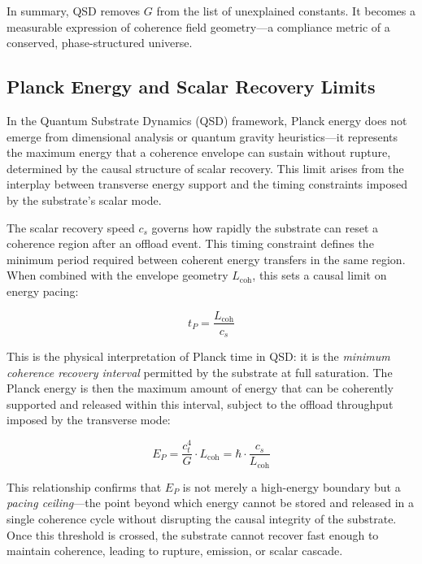 \documentclass[entropy,article,submit,pdftex,moreauthors]{Definitions/mdpi}
\begin{document}
\medskip
In summary, QSD removes $G$ from the list of unexplained constants. It becomes a measurable expression of coherence field geometry—a compliance metric of a conserved, phase-structured universe.

\subsection{Planck Energy and Scalar Recovery Limits}

In the Quantum Substrate Dynamics (QSD) framework, Planck energy does not emerge from dimensional analysis or quantum gravity heuristics—it represents the maximum energy that a coherence envelope can sustain without rupture, determined by the causal structure of scalar recovery. This limit arises from the interplay between transverse energy support and the timing constraints imposed by the substrate’s scalar mode.

The scalar recovery speed $c_s$ governs how rapidly the substrate can reset a coherence region after an offload event. This timing constraint defines the minimum period required between coherent energy transfers in the same region. When combined with the envelope geometry $L_{\text{coh}}$, this sets a causal limit on energy pacing:

\begin{equation}
t_P = \frac{L_{\text{coh}}}{c_s}
\end{equation}

This is the physical interpretation of Planck time in QSD: it is the \textit{minimum coherence recovery interval} permitted by the substrate at full saturation. The Planck energy is then the maximum amount of energy that can be coherently supported and released within this interval, subject to the offload throughput imposed by the transverse mode:

\begin{equation}
E_P = \frac{c_t^4}{G} \cdot L_{\text{coh}} = \hbar \cdot \frac{c_s}{L_{\text{coh}}}
\end{equation}

This relationship confirms that $E_P$ is not merely a high-energy boundary but a \textit{pacing ceiling}—the point beyond which energy cannot be stored and released in a single coherence cycle without disrupting the causal integrity of the substrate. Once this threshold is crossed, the substrate cannot recover fast enough to maintain coherence, leading to rupture, emission, or scalar cascade.
\end{document}
